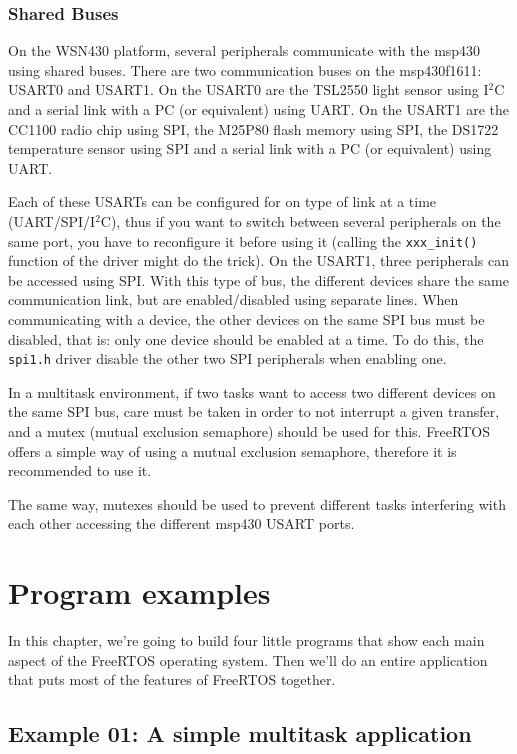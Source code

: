 \documentclass[11pt]{report}
\begin{document}
\subsection{Shared Buses}
On the WSN430 platform, several peripherals communicate with the msp430 using shared buses. There are two communication buses on the msp430f1611: USART0 and USART1. On the USART0 are the TSL2550 light sensor using I$^2$C and a serial link with a PC (or equivalent) using UART. On the USART1 are the CC1100 radio chip using SPI, the M25P80 flash memory using SPI, the DS1722 temperature sensor using SPI and a serial link with a PC (or equivalent) using UART.

Each of these USARTs can be configured for on type of link at a time (UART/SPI/I$^2$C), thus if you want to switch between several peripherals on the same port, you have to reconfigure it before using it (calling the \verb$xxx_init()$ function of the driver might do the trick). On the USART1, three peripherals can be accessed using SPI. With this type of bus, the different devices share the same communication link, but are enabled/disabled using separate lines. When communicating with a device, the other devices on the same SPI bus must be disabled, that is: only one device should be enabled at a time. To do this, the \verb$spi1.h$ driver disable the other two SPI peripherals when enabling one.

In a multitask environment, if two tasks want to access two different devices on the same SPI bus, care must be taken in order to not interrupt a given transfer, and a mutex (mutual exclusion semaphore) should be used for this. FreeRTOS offers a simple way of using a mutual exclusion semaphore, therefore it is recommended to use it.

The same way, mutexes should be used to prevent different tasks interfering with each other accessing the different msp430 USART ports.


\chapter{Program examples}

In this chapter, we're going to build four little programs that show each main aspect of the FreeRTOS operating system. Then we'll do an entire application that puts most of the features of FreeRTOS together.

\section{Example 01: A simple multitask application}
\end{document}
